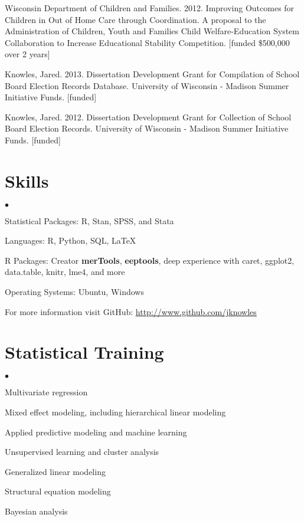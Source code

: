 \documentclass[margin,line]{res}
\newenvironment{list2}{
  \begin{list}{$\bullet$}{%
      \setlength{\itemsep}{0in}
      \setlength{\parsep}{0in} \setlength{\parskip}{0in}
      \setlength{\topsep}{0in} \setlength{\partopsep}{0in} 
      \setlength{\leftmargin}{0.2in}}}{\end{list}}
\begin{document}
\begin{resume}
Wisconsin Department of Children and Families. 2012. Improving Outcomes for Children in Out of Home Care through Coordination. A proposal to the Administration of Children, Youth and Families 
 Child Welfare-Education System Collaboration to Increase Educational Stability Competition. [funded \$500,000 over 2 years]

Knowles, Jared. 2013. Dissertation Development Grant for Compilation of School Board Election Records Database. University of Wisconsin - Madison Summer Initiative Funds. [funded]

Knowles, Jared. 2012. Dissertation Development Grant for Collection of School Board Election Records. University of Wisconsin - Madison Summer Initiative Funds. [funded]

\section{\sc Skills} 
\begin{list2}
\item Statistical Packages:  R, Stan, SPSS, and Stata
\item Languages:  R, Python, SQL, \LaTeX
\item R Packages: Creator \textbf{merTools}, \textbf{eeptools}, deep experience with caret, ggplot2, data.table, knitr, lme4, and more
\item Operating Systems:  Ubuntu, Windows
\item For more information visit GitHub: \url{http://www.github.com/jknowles}\\
\end{list2}

\section{\sc Statistical Training}
\begin{list2}
\item Multivariate regression
\item Mixed effect modeling, including hierarchical linear modeling
\item Applied predictive modeling and machine learning
\item Unsupervised learning and cluster analysis
\item Generalized linear modeling
\item Structural equation modeling
\item Bayesian analysis
\end{list2}

% 


\end{resume}
\end{document}

